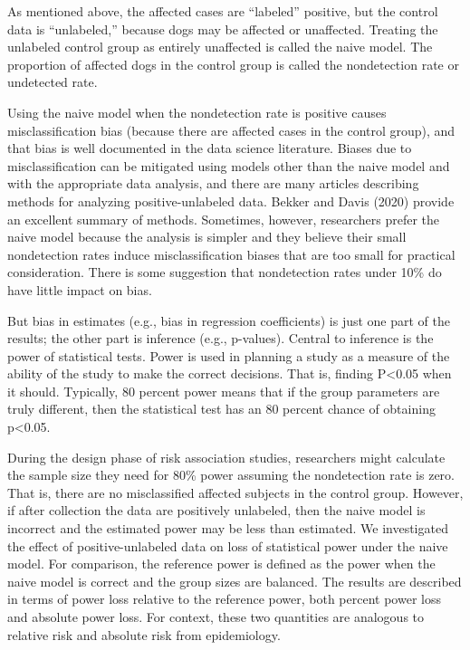 \documentclass[
]{article}
\begin{document}
As mentioned above, the affected cases are ``labeled'' positive, but the
control data is ``unlabeled,'' because dogs may be affected or
unaffected. Treating the unlabeled control group as entirely unaffected
is called the naive model. The proportion of affected dogs in the
control group is called the nondetection rate or undetected rate.

Using the naive model when the nondetection rate is positive causes
misclassification bias (because there are affected cases in the control
group), and that bias is well documented in the data science literature.
\cite{bd20} Biases due to misclassification can be mitigated using
models other than the naive model and with the appropriate data
analysis, and there are many articles describing methods for analyzing
positive-unlabeled data. Bekker and Davis (2020) provide an excellent
summary of methods. \cite{bd20} Sometimes, however, researchers prefer
the naive model because the analysis is simpler and they believe their
small nondetection rates induce misclassification biases that are too
small for practical consideration. There is some suggestion that
nondetection rates under 10\% do have little impact on bias. \cite{bd20}

But bias in estimates (e.g., bias in regression coefficients) is just
one part of the results; the other part is inference (e.g., p-values).
Central to inference is the power of statistical tests. Power is used in
planning a study as a measure of the ability of the study to make the
correct decisions. That is, finding P\textless0.05 when it should.
Typically, 80 percent power means that if the group parameters are truly
different, then the statistical test has an 80 percent chance of
obtaining p\textless0.05.

During the design phase of risk association studies, researchers might
calculate the sample size they need for 80\% power assuming the
nondetection rate is zero. That is, there are no misclassified affected
subjects in the control group. However, if after collection the data are
positively unlabeled, then the naive model is incorrect and the
estimated power may be less than estimated. We investigated the effect
of positive-unlabeled data on loss of statistical power under the naive
model. For comparison, the reference power is defined as the power when
the naive model is correct and the group sizes are balanced. The results
are described in terms of power loss relative to the reference power,
both percent power loss and absolute power loss. For context, these two
quantities are analogous to relative risk and absolute risk from
epidemiology.
\end{document}
